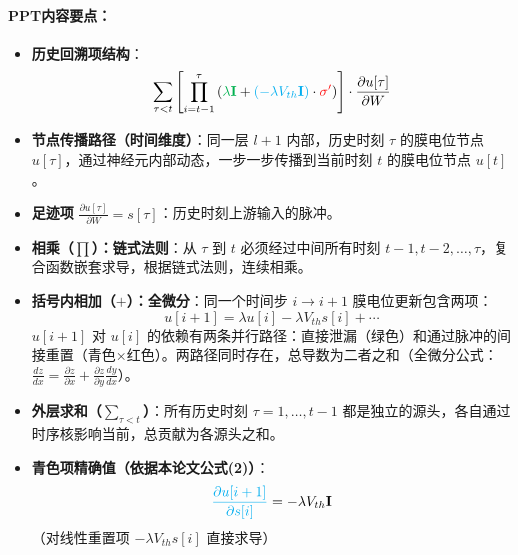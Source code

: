 \documentclass[journal,12pt,onecolumn]{IEEEtran}
\begin{document}
\paragraph{\textbf{PPT内容要点：}}
\begin{itemize}
    \item \textbf{历史回溯项结构}：
    \[
    \sum_{\tau < t} \left[ \prod_{i=t-1}^{\tau} \left( 
    {\color[rgb]{0,0.69,0.31}{\lambda \mathbf{I}}} 
    + {\color{cyan}{(-\lambda V_{th} \mathbf{I})}} \cdot {\color{red}{\sigma'}} 
    \right) \right] \cdot \frac{\partial u[\tau]}{\partial W}
    \]
    \item \textbf{节点传播路径（时间维度）}：同一层 \(l+1\) 内部，历史时刻 \(\tau\) 的膜电位节点 \(u[\tau]\)，通过神经元内部动态，一步一步传播到当前时刻 \(t\) 的膜电位节点 \(u[t]\)。
    \item \textbf{足迹项} \(\frac{\partial u[\tau]}{\partial W} = s[\tau]\)：历史时刻上游输入的脉冲。
    \item \textbf{相乘（\(\prod\)）：链式法则}：从 \(\tau\) 到 \(t\) 必须经过中间所有时刻 \(t-1, t-2, \dots, \tau\)，复合函数嵌套求导，根据链式法则，连续相乘。
    \item \textbf{括号内相加（\(+\)）：全微分}：同一个时间步 \(i \to i+1\) 膜电位更新包含两项：
    \[
    u[i+1] = \lambda u[i] - \lambda V_{th} s[i] + \cdots
    \]
    \(u[i+1]\) 对 \(u[i]\) 的依赖有两条并行路径：直接泄漏（绿色）和通过脉冲的间接重置（青色×红色）。两路径同时存在，总导数为二者之和（全微分公式：\(\frac{dz}{dx} = \frac{\partial z}{\partial x} + \frac{\partial z}{\partial y}\frac{dy}{dx}\)）。
    \item \textbf{外层求和（\(\sum_{\tau < t}\)）}：所有历史时刻 \(\tau = 1, \dots, t-1\) 都是独立的源头，各自通过时序核影响当前，总贡献为各源头之和。
    \item \textbf{青色项精确值（依据本论文公式(2)）}：
    \[
    {\color{cyan}{\frac{\partial u[i+1]}{\partial s[i]}}} = -\lambda V_{th} \mathbf{I}
    \]
    （对线性重置项 \(-\lambda V_{th} s[i]\) 直接求导）
\end{itemize}
\end{document}
